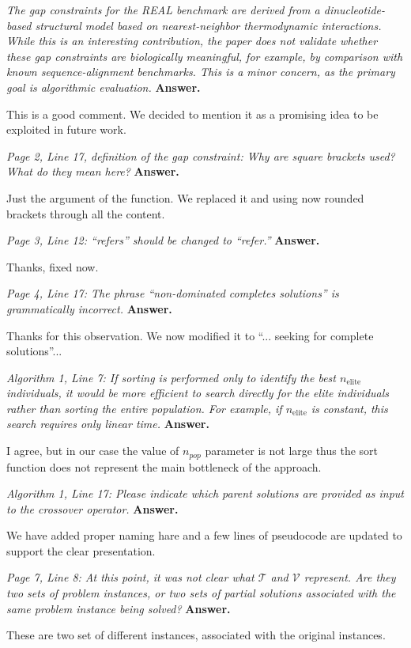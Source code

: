 \documentclass[11pt,a4paper]{article}
\renewenvironment{leftbar}{%
  \def\FrameCommand{\textcolor{reviewbar}{\vrule width 3pt}\hspace{10pt}}%
  \MakeFramed{\advance\hsize-\width\FrameRestore}%
}{\endMakeFramed}
\newcommand{\reviewcomment}[1]{%
\begin{leftbar}
\textit{#1}
\end{leftbar} \textbf{Answer.} 
}
\begin{document}
\reviewcomment{The gap constraints for the REAL benchmark are derived from a dinucleotide-based structural model based on nearest-neighbor thermodynamic interactions. While this is an interesting contribution, the paper does not validate whether these gap constraints are biologically meaningful, for example, by comparison with known sequence-alignment benchmarks. This is a minor concern, as the primary goal is algorithmic evaluation.}

This is a good comment. We decided to mention it as a promising idea to be exploited in future work. 
\reviewcomment{Page 2, Line 17, definition of the gap constraint: Why are square brackets used? What do they mean here?}

Just the argument of the function. We replaced it and  using now rounded brackets through all the content. 

\reviewcomment{Page 3, Line 12: ``refers'' should be changed to ``refer.''}

Thanks, fixed now.

\reviewcomment{Page 4, Line 17: The phrase ``non-dominated completes solutions'' is grammatically incorrect.}

Thanks for this observation. We now modified it to ``... seeking for complete solutions''... 

\reviewcomment{Algorithm 1, Line 7: If sorting is performed only to identify the best $n_{\mathrm{elite}}$ individuals, it would be more efficient to search directly for the elite individuals rather than sorting the entire population. For example, if $n_{\mathrm{elite}}$ is constant, this search requires only linear time.}

I agree, but in our case the value of $n_{pop}$ parameter is not large thus the sort function does not represent the main bottleneck of the approach. 

\reviewcomment{Algorithm 1, Line 17: Please indicate which parent solutions are provided as input to the crossover operator.}

We have added proper naming hare and a few lines of pseudocode are updated to support the clear presentation. 

\reviewcomment{Page 7, Line 8: At this point, it was not clear what $\mathcal{T}$ and $\mathcal{V}$ represent. Are they two sets of problem instances, or two sets of partial solutions associated with the same problem instance being solved?}

These are two set of different instances, associated with the original instances.
\end{document}
